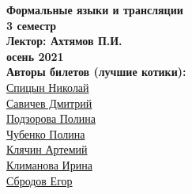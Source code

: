


    \thispagestyle{empty}
    \BgThispage
    \begin{center}
        \vspace*{4cm}
        
        \Huge
        \textbf{Формальные языки и трансляции} \\
        \textbf{3 семестр} \\
        \textbf{Лектор: Ахтямов П.И.} \\
        \textbf{осень 2021} \\
    
        
        \vspace{7cm}
        \Large
        \textbf{Авторы билетов (лучшие котики):} \\
        \href{https://vk.com/spitsynn}{Спицын Николай} \\
        \href{https://vk.com/dimasav123}{Савичев Дмитрий} \\
        \href{https://vk.com/id165779384}{Подзорова Полина} \\
        \href{https://vk.com/poli.dobro}{Чубенко Полина} \\
        \href{https://vk.com/id340504554}{Клячин Артемий} \\
        \href{https://vk.com/meraklim}{Климанова Ирина} \\
        \href{https://vk.com/ulegor}{Сбродов Егор} \\
        
    \end{center}

\newpage

\tableofcontents
\newpage

     
    
     
    
     
    
     


